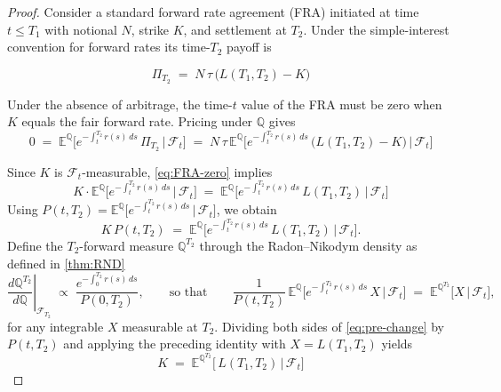     \begin{proof}
    Consider a standard forward rate agreement (FRA) initiated at time $t \le T_1$ with notional $N$, strike $K$, and settlement at $T_2$. Under the simple-interest convention for forward rates its time-$T_2$ payoff is
    
    \begin{equation}
            \Pi_{T_2} \;=\; N\,\tau\,\big(L(T_1,T_2) - K\big)
    \end{equation}

    \noindent
    Under the absence of arbitrage, the time-$t$ value of the FRA must be zero when $K$ equals the fair forward rate. Pricing under $\mathbb{Q}$ gives
    \begin{equation}\label{eq:FRA-zero}
    0 \;=\; \mathbb{E}^{\mathbb{Q}}\!\Big[ e^{-\int_t^{T_2} r(s)\,ds}\,\Pi_{T_2} \,\Big|\, \mathcal{F}_t \Big]
     \;=\; N\,\tau\,\mathbb{E}^{\mathbb{Q}}\!\Big[ e^{-\int_t^{T_2} r(s)\,ds}\, \big(L(T_1,T_2) - K\big) \,\Big|\, \mathcal{F}_t \Big]
    \end{equation}
    
    \noindent
    Since $K$ is $\mathcal{F}_t$-measurable, \eqref{eq:FRA-zero} implies
    \begin{equation}
        K \cdot \mathbb{E}^{\mathbb{Q}}\!\Big[ e^{-\int_t^{T_2} r(s)\,ds} \,\Big|\, \mathcal{F}_t \Big]
        \;=\; \mathbb{E}^{\mathbb{Q}}\!\Big[ e^{-\int_t^{T_2} r(s)\,ds}\, L(T_1,T_2) \,\Big|\, \mathcal{F}_t \Big]
    \end{equation}
    Using $P(t,T_2) = \mathbb{E}^{\mathbb{Q}}\!\big[ e^{-\int_t^{T_2} r(s)\,ds} \,\big|\, \mathcal{F}_t \big]$, we obtain
    \begin{equation}\label{eq:pre-change}
    K \, P(t,T_2) \;=\; \mathbb{E}^{\mathbb{Q}}\!\Big[ e^{-\int_t^{T_2} r(s)\,ds}\, L(T_1,T_2) \,\Big|\, \mathcal{F}_t \Big].
    \end{equation}
    Define the $T_2$-forward measure $\mathbb{Q}^{T_2}$ through the Radon--Nikodym density as defined in \ref{thm:RND}
    \[
    \left.\frac{d\mathbb{Q}^{T_2}}{d\mathbb{Q}}\right|_{\mathcal{F}_{T_2}}
    \;\propto\;
    \frac{e^{-\int_0^{T_2} r(s)\,ds}}{P(0,T_2)},
    \qquad\text{so that}\qquad
    \frac{1}{P(t,T_2)}\,\mathbb{E}^{\mathbb{Q}}\!\Big[ e^{-\int_t^{T_2} r(s)\,ds}\,X \,\Big|\, \mathcal{F}_t \Big]
    \;=\; \mathbb{E}^{\mathbb{Q}^{T_2}}\!\big[ X \,\big|\, \mathcal{F}_t \big],
    \]
    for any integrable $X$ measurable at $T_2$. Dividing both sides of \eqref{eq:pre-change} by $P(t,T_2)$ and applying the preceding identity with $X=L(T_1,T_2)$ yields 
    \[
        K \;=\; \mathbb{E}^{\mathbb{Q}^{T_2}}\!\big[\, L(T_1,T_2) \,\big|\, \mathcal{F}_t \big]
    \]
    

\end{proof}
